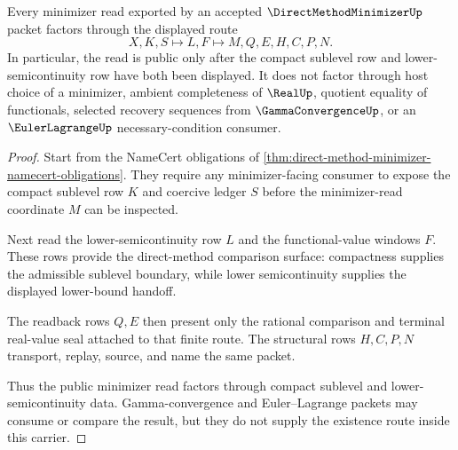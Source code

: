 \begin{theorem}
\label{thm:direct-method-minimizer-compact-sublevel-route}
Every minimizer read exported by an accepted $\DirectMethodMinimizerUp$ packet factors through the displayed route
$$
X,K,S \longmapsto L,F \longmapsto M,Q,E,H,C,P,N .
$$
In particular, the read is public only after the compact sublevel row and lower-semicontinuity row have both been displayed. It does not factor through host choice of a minimizer, ambient completeness of $\RealUp$, quotient equality of functionals, selected recovery sequences from $\GammaConvergenceUp$, or an $\EulerLagrangeUp$ necessary-condition consumer.
\end{theorem}
\begin{proof}
Start from the NameCert obligations of \autoref{thm:direct-method-minimizer-namecert-obligations}. They require any minimizer-facing consumer to expose the compact sublevel row $K$ and coercive ledger $S$ before the minimizer-read coordinate $M$ can be inspected.

Next read the lower-semicontinuity row $L$ and the functional-value windows $F$. These rows provide the direct-method comparison surface: compactness supplies the admissible sublevel boundary, while lower semicontinuity supplies the displayed lower-bound handoff.

The readback rows $Q,E$ then present only the rational comparison and terminal real-value seal attached to that finite route. The structural rows $H,C,P,N$ transport, replay, source, and name the same packet.

Thus the public minimizer read factors through compact sublevel and lower-semicontinuity data. Gamma-convergence and Euler--Lagrange packets may consume or compare the result, but they do not supply the existence route inside this carrier.
\end{proof}



